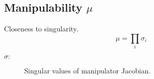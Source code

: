 \subsection{Manipulability \texorpdfstring{\hfill $\mu$}{mu}}
    Closeness to singularity.
    $$
        \mu = \prod_i \sigma_i
    $$
    \begin{description}
        \item[$\sigma :$] Singular values of manipulator Jacobian. 
    \end{description}
